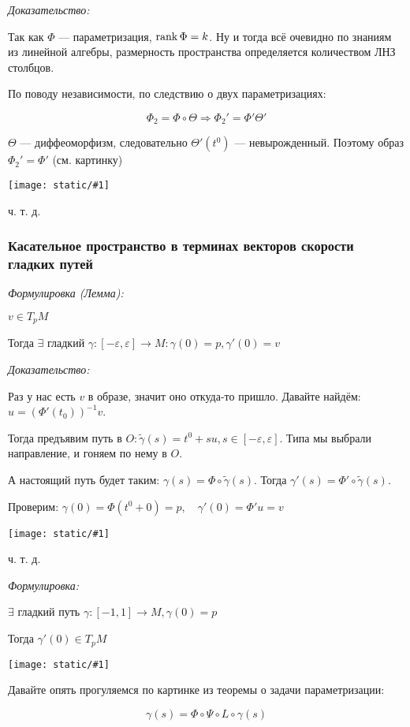 \documentclass{article}
\def\image#1{\texttt{[image: static/\#1]}}
\begin{document}
\textit{Доказательство:}

Так как $\Phi$ --- параметризация, $\rank \Phi = k$. Ну и тогда всё очевидно по знаниям из линейной алгебры, размерность пространства определяется количеством ЛНЗ столбцов.

По поводу независимости, по следствию о двух параметризациях:

\[\Phi_2 = \Phi \circ \Theta \Rightarrow \Phi_2' = \Phi' \Theta'\]

$\Theta$ --- диффеоморфизм, следовательно $\Theta'(t^0)$ --- невырожденный. Поэтому образ $\Phi_2' = \Phi'$ (см. картинку)

\image{lemm_corr_par.png}

ч. т. д.

\subsubsection{Касательное пространство в терминах векторов скорости гладких путей}
\textit{Формулировка (Лемма):}

$v \in T_p M$

Тогда $\exists $ гладкий $ \gamma: [-\varepsilon, \varepsilon] \rightarrow M: \gamma(0) = p, \gamma'(0) = v$

\textit{Доказательство:}

Раз у нас есть $v$ в образе, значит оно откуда-то пришло. Давайте найдём: $u = (\Phi'(t_0))^{-1} v$.

Тогда предъявим путь в $O: \widetilde{\gamma}(s) = t^0 + su, s \in [-\varepsilon, \varepsilon]$. Типа мы выбрали направление, и гоняем по нему в $O$.

А настоящий путь будет таким: $\gamma(s) = \Phi \circ \widetilde{\gamma}(s)$. Тогда $\gamma'(s) = \Phi' \circ \widetilde{\gamma}(s)$.

Проверим: $\gamma(0) = \Phi (t^0 + 0) = p, \quad \gamma'(0) = \Phi' u = v$

\image{lemm_gl_p.png}

ч. т. д.

\textit{Формулировка:}

$\exists $ гладкий путь $ \gamma: [-1, 1] \rightarrow M, \gamma(0) = p$

Тогда $\gamma'(0) \in T_p M$


\image{lemm_sk.png}

Давайте опять прогуляемся по картинке из теоремы о задачи параметризации: 

\[\gamma(s) = \Phi \circ \Psi \circ L \circ \gamma(s)\]
\end{document}
